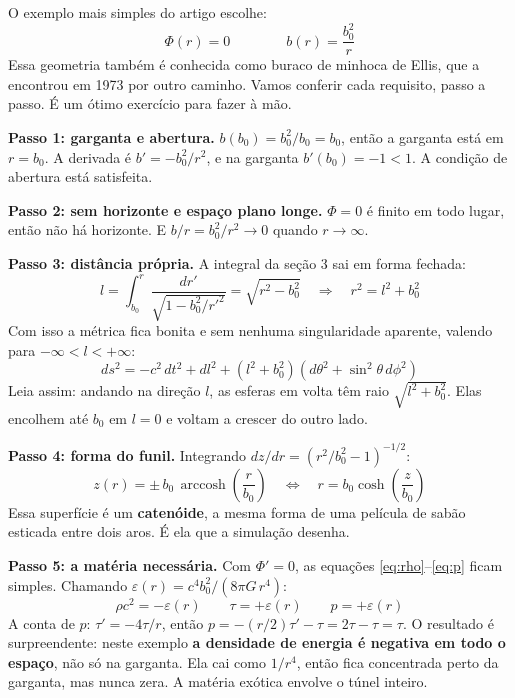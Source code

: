 \documentclass[11pt,a4paper]{article}
\begin{document}
O exemplo mais simples do artigo escolhe:
\begin{equation*}
\Phi(r) = 0 \qquad\qquad b(r) = \frac{b_0^2}{r}
\end{equation*}
Essa geometria também é conhecida como buraco de minhoca de Ellis, que a encontrou em 1973 por outro caminho. Vamos
conferir cada requisito, passo a passo. É um ótimo exercício para fazer à mão.

\textbf{Passo 1: garganta e abertura.} $b(b_0) = b_0^2/b_0 = b_0$, então a garganta está em $r = b_0$. A derivada é
$b' = -b_0^2/r^2$, e na garganta $b'(b_0) = -1 < 1$. A condição de abertura está satisfeita.

\textbf{Passo 2: sem horizonte e espaço plano longe.} $\Phi = 0$ é finito em todo lugar, então não há horizonte. E
$b/r = b_0^2/r^2 \to 0$ quando $r \to \infty$.

\textbf{Passo 3: distância própria.} A integral da seção 3 sai em forma fechada:
\begin{equation*}
l = \int_{b_0}^{r} \frac{dr'}{\sqrt{1 - b_0^2/r'^2}} = \sqrt{r^2 - b_0^2} \quad\Longrightarrow\quad r^2 = l^2 + b_0^2
\end{equation*}
Com isso a métrica fica bonita e sem nenhuma singularidade aparente, valendo para $-\infty < l < +\infty$:
\begin{equation}
ds^2 = -c^2\,dt^2 + dl^2 + \left(l^2 + b_0^2\right)\left(d\theta^2 + \sin^2\theta\,d\phi^2\right)
\end{equation}
Leia assim: andando na direção $l$, as esferas em volta têm raio $\sqrt{l^2 + b_0^2}$. Elas encolhem até $b_0$ em
$l = 0$ e voltam a crescer do outro lado.

\textbf{Passo 4: forma do funil.} Integrando $dz/dr = (r^2/b_0^2 - 1)^{-1/2}$:
\begin{equation*}
z(r) = \pm\, b_0\,\operatorname{arccosh}\!\left(\frac{r}{b_0}\right) \quad\Longleftrightarrow\quad
r = b_0 \cosh\!\left(\frac{z}{b_0}\right)
\end{equation*}
Essa superfície é um \textbf{catenóide}, a mesma forma de uma película de sabão esticada entre dois aros. É ela que a
simulação desenha.

\textbf{Passo 5: a matéria necessária.} Com $\Phi' = 0$, as equações \eqref{eq:rho}--\eqref{eq:p} ficam simples.
Chamando $\varepsilon(r) = c^4 b_0^2/(8\pi G\, r^4)$:
\begin{equation}
\rho c^2 = -\varepsilon(r) \qquad \tau = +\varepsilon(r) \qquad p = +\varepsilon(r)
\end{equation}
A conta de $p$: $\tau' = -4\tau/r$, então $p = -(r/2)\tau' - \tau = 2\tau - \tau = \tau$. O resultado é surpreendente:
neste exemplo \textbf{a densidade de energia é negativa em todo o espaço}, não só na garganta. Ela cai como $1/r^4$,
então fica concentrada perto da garganta, mas nunca zera. A matéria exótica envolve o túnel inteiro.
\end{document}
